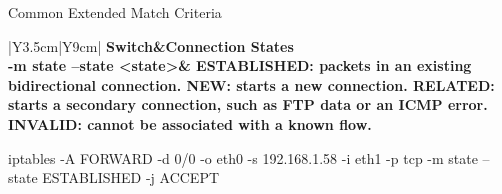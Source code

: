 \begin{frame}{Common Extended Match Criteria}
\centering\fontsize{11.5}{13.5}\selectfont
\renewcommand{\arraystretch}{1.28}
\begin{tabular}{|Y{3.5cm}|Y{9cm}|}\hline
{}\color{white}\bfseries Switch&\color{white}\bfseries Connection States\\\hline
\textcolor{CommandGreen}{\ttfamily\bfseries -m state --state <state>}&
\textcolor{WarningColor}{\bfseries ESTABLISHED}: packets in an existing bidirectional connection.\newline
\textcolor{WarningColor}{\bfseries NEW}: starts a new connection.\newline
\textcolor{WarningColor}{\bfseries RELATED}: starts a secondary connection, such as FTP data or an ICMP error.\newline
\textcolor{WarningColor}{\bfseries INVALID}: cannot be associated with a known flow.\\\hline
\end{tabular}
\vspace{0.25cm}
{\color{CommandGreen}\ttfamily\fontsize{10.5}{12.5}\selectfont iptables -A FORWARD -d 0/0 -o eth0 -s 192.168.1.58 -i eth1 -p tcp -m state --state ESTABLISHED -j ACCEPT\par}
\end{frame}
